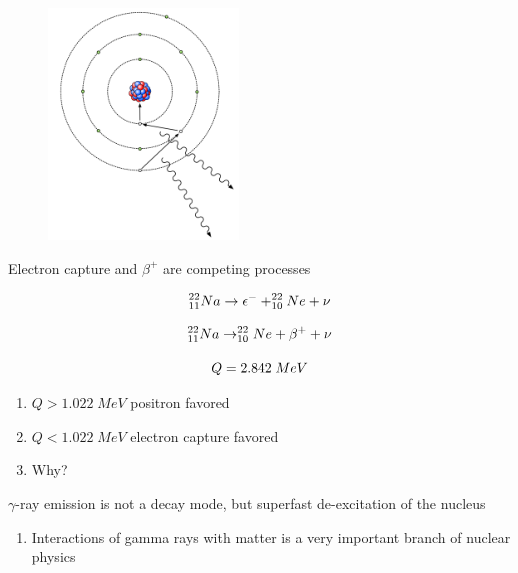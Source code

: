 \documentclass[aspectratio=1610,pdftex,dvipsnames,compress,xcolor={dvipsnames}]{beamer}
\begin{document}
\begin{frame}{}
    \begin{figure}
        \centering
        \includegraphics[width=0.45\textwidth]{ec.shell.jpg}
    \end{figure}
\end{frame}


\begin{frame}{Electron capture and $\beta^+$ are competing processes}

    \begin{equation}
        \LARGE
        ^{22}_{11}Na \rightarrow \epsilon^- + ^{22}_{10}Ne + \nu 
    \end{equation}

    \begin{equation}
        \LARGE
        ^{22}_{11}Na \rightarrow ^{22}_{10}Ne + \beta^{+} + \nu 
    \end{equation}

    \begin{equation}
        \LARGE
        Q = 2.842 \; MeV
    \end{equation}

    \vspace*{\fill}

    \begin{enumerate}[series=outerlist,topsep=0pt,itemsep=21pt,leftmargin=*,label=(\arabic*)]
        \item[]$Q > 1.022 \; MeV$ positron favored
        \item[]$Q < 1.022 \; MeV$ electron capture favored
        \item[]Why?
    \end{enumerate}
\end{frame}


\begin{frame}{$\gamma$-ray emission is not a decay mode, but superfast de-excitation of the nucleus}
    \begin{enumerate}[series=outerlist,topsep=0pt,itemsep=21pt,leftmargin=*,label=(\arabic*)]
        \item[]Interactions of gamma rays with matter is a very important branch of nuclear physics
    \end{enumerate}
\end{frame}
\end{document}
